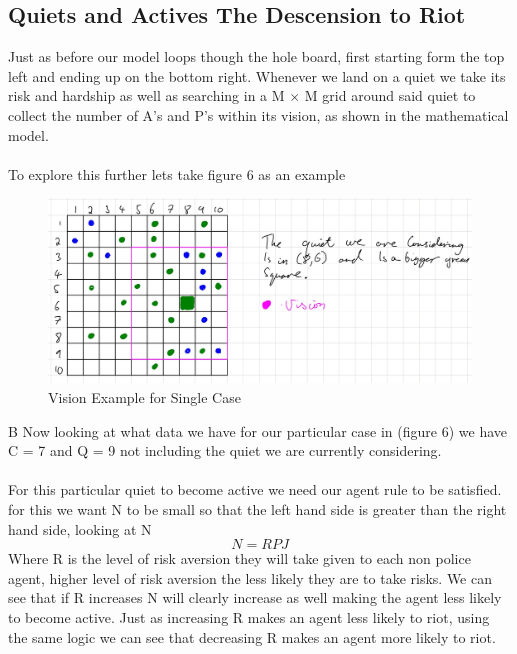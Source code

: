 \documentclass[11pt]{article}
\begin{document}
	\subsection{Quiets and Actives The Descension to Riot}
	Just as before our model loops though the hole board, first starting form the top left and ending up on the bottom right. Whenever we land on a quiet we take its risk and hardship as well as searching in a M $\times$  M grid around said quiet to collect the number of A's and P's within its vision, as shown in the mathematical model.\\
	\\
	To explore this further lets take figure 6 as an example
	\begin{figure}[H]
		\includegraphics[width=\linewidth]{vision for single case.png}
		\caption{Vision Example for Single Case}
		\label{fig:frenchriot}
	\end{figure}	
	B
	Now looking at what data we have for our particular case in (figure 6) we have C = 7 and Q = 9 not including the quiet we are currently considering. \\
	\\
	For this particular	quiet to become active we need our agent rule to be satisfied. for this we want N to be small so that the left hand side is greater than the right hand side, looking at N
	\\
	\begin{equation}
			N = RPJ 
	\end{equation}
	Where R is the level of risk aversion they will take given to each non police agent, higher level of risk aversion the less likely they are to take risks. We can see that if R increases N will clearly increase as well making the agent less likely to become active. Just as increasing R makes an agent less likely to riot, using the same logic we can see that decreasing R makes an agent more likely to riot.\\
	\\
\end{document}
